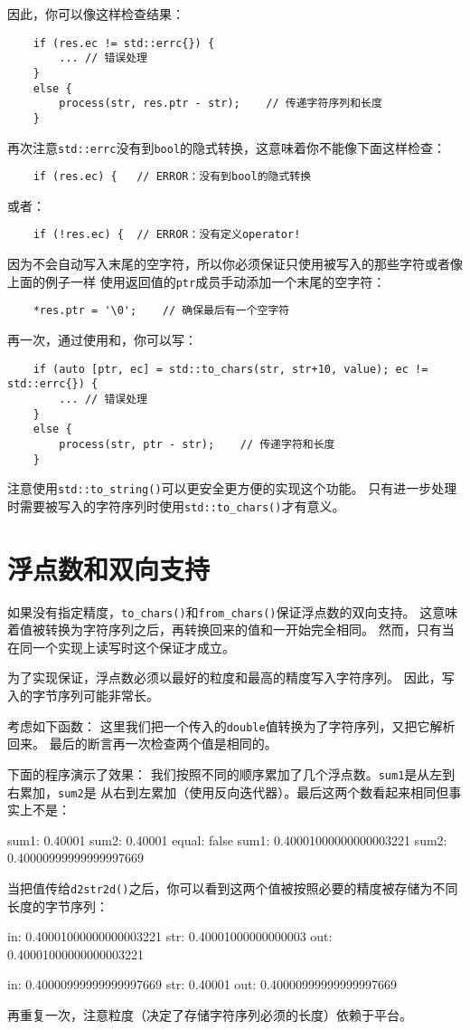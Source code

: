 因此，你可以像这样检查结果：
\begin{lstlisting}
    if (res.ec != std::errc{}) {
        ... // 错误处理
    }
    else {
        process(str, res.ptr - str);    // 传递字符序列和长度
    }
\end{lstlisting}
再次注意\texttt{std::errc}没有到\texttt{bool}的隐式转换，这意味着你不能像下面这样检查：
\begin{lstlisting}
    if (res.ec) {   // ERROR：没有到bool的隐式转换
\end{lstlisting}
或者：
\begin{lstlisting}
    if (!res.ec) {  // ERROR：没有定义operator!
\end{lstlisting}
因为不会自动写入末尾的空字符，所以你必须保证只使用被写入的那些字符或者像上面的例子一样
使用返回值的\texttt{ptr}成员手动添加一个末尾的空字符：
\begin{lstlisting}
    *res.ptr = '\0';    // 确保最后有一个空字符
\end{lstlisting}
再一次，通过使用和，你可以写：
\begin{lstlisting}
    if (auto [ptr, ec] = std::to_chars(str, str+10, value); ec != std::errc{}) {
        ... // 错误处理
    }
    else {
        process(str, ptr - str);    // 传递字符和长度
    }
\end{lstlisting}
注意使用\texttt{std::to\_string()}可以更安全更方便的实现这个功能。
只有进一步处理时需要被写入的字符序列时使用\texttt{std::to\_chars()}才有意义。

\section{浮点数和双向支持}
如果没有指定精度，\texttt{to\_chars()}和\texttt{from\_chars()}保证浮点数的双向支持。
这意味着值被转换为字符序列之后，再转换回来的值和一开始完全相同。
然而，只有当在同一个实现上读写时这个保证才成立。

为了实现保证，浮点数必须以最好的粒度和最高的精度写入字符序列。
因此，写入的字节序列可能非常长。

考虑如下函数：
这里我们把一个传入的\texttt{double}值转换为了字符序列，又把它解析回来。
最后的断言再一次检查两个值是相同的。

下面的程序演示了效果：
我们按照不同的顺序累加了几个浮点数。\texttt{sum1}是从左到右累加，\texttt{sum2}是
从右到左累加（使用反向迭代器）。最后这两个数看起来相同但事实上不是：
\begin{blacklisting}
    sum1:  0.40001
    sum2:  0.40001
    equal: false
    sum1:  0.40001000000000003221
    sum2:  0.40000999999999997669
\end{blacklisting}
当把值传给\texttt{d2str2d()}之后，你可以看到这两个值被按照必要的精度被存储为不同长度的字节序列：
\begin{blacklisting}
    in:  0.40001000000000003221
    str: 0.40001000000000003
    out: 0.40001000000000003221

    in:  0.40000999999999997669
    str: 0.40001
    out: 0.40000999999999997669
\end{blacklisting}
再重复一次，注意粒度（决定了存储字符序列必须的长度）依赖于平台。


